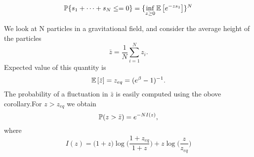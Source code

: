 \documentclass[letterpaper,english,12pt]{article}
\begin{document}
 \begin{exmp}
   \begin{equation}
       \P \{s_1 + \dots + s_N \leq  = 0\} = \{ \inf_{z\geq 0} \E {e^{-zs_1}}  \}^N
   \end{equation}
     
 \end{exmp}
 
 \begin{exmp}
   We look at N particles in a gravitational field, and consider the average height of the particles 
   \begin{equation}
       \bar{z}= \dfrac{1}{N}\sum_{i=1}^{N}z_i.
    \end{equation}
     Expected value of this quantity  is 
       \begin{equation}
           \E{\bar{z}}= z_{eq}= (e^\beta -1)^{-1}.
           \end{equation}
           The probability of a fluctuation in $\bar{z}$ is easily computed using the obove corollary.For $z>z_{eq}$ we obtain \\
           \begin{equation}
               \P(z>\bar{z}) = e^{-NI(z)},
           \end{equation}
           where 
           \begin{equation}
               I(z) = \big(1+z\big)\log \big( \dfrac{1+z_{eq}}{1+z}\big) + z\log{\big(\dfrac{z}{z_{eq}}\big)}
           \end{equation}
           
       
   
 \end{exmp}
\end{document}
